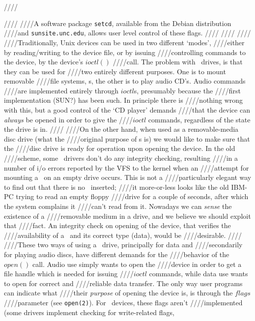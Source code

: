 ////\documentclass{article}
\begin{document}
////
////A software package {\tt setcd}, available from the Debian distribution
////and {\tt sunsite.unc.edu}, allows user level control of these flags. 
////
////
////
////Traditionally, Unix devices can be used in two different `modes',
////either by reading/writing to the device file, or by issuing
////controlling commands to the device, by the device's $ioctl()$
////call. The problem with \cdrom\ drives, is that they can be used for
////two entirely different purposes. One is to mount removable
////file systems, \cdrom s, the other is to play audio CD's. Audio commands
////are implemented entirely through $ioctl$s, presumably because the
////first implementation (SUN?) has been such. In principle there is
////nothing wrong with this, but a good control of the `CD player' demands
////that the device can {\em always\/} be opened in order to give the
////$ioctl$ commands, regardless of the state the drive is in. 
////
////On the other hand, when used as a removable-media disc drive (what the
////original purpose of \cdrom s is) we would like to make sure that the
////disc drive is ready for operation upon opening the device. In the old
////scheme, some \cdrom\ drivers don't do any integrity checking, resulting
////in a number of i/o errors reported by the VFS to the kernel when an
////attempt for mounting a \cdrom\ on an empty drive occurs. This is not a
////particularly elegant way to find out that there is no \cdrom\ inserted;
////it more-or-less looks like the old IBM-PC trying to read an empty floppy
////drive for a couple of seconds, after which the system complains it
////can't read from it. Nowadays we can {\em sense\/} the existence of a
////removable medium in a drive, and we believe we should exploit that
////fact. An integrity check on opening of the device, that verifies the
////availability of a \cdrom\ and its correct type (data), would be
////desirable.
////
////These two ways of using a \cdrom\ drive, principally for data and
////secondarily for playing audio discs, have different demands for the
////behavior of the $open()$ call. Audio use simply wants to open the
////device in order to get a file handle which is needed for issuing
////$ioctl$ commands, while data use wants to open for correct and
////reliable data transfer. The only way user programs can indicate what
////their {\em purpose\/} of opening the device is, is through the $flags$
////parameter (see {\tt {open(2)}}). For \cdrom\ devices, these flags aren't
////implemented (some drivers implement checking for write-related flags,
\end{document}
